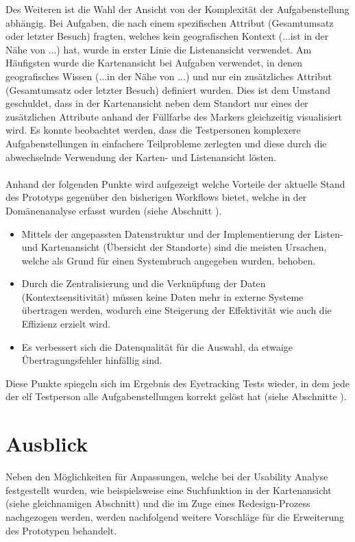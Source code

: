 \documentclass[Bachelorarbeit.tex]{subfiles}
\begin{document}
Des Weiteren ist die Wahl der Ansicht von der Komplexität der Aufgabenstellung abhängig.
Bei Aufgaben, die nach einem spezifischen Attribut (Gesamtumsatz oder letzter Besuch) fragten, welches kein geografischen Kontext (...ist in der Nähe von ...) hat, wurde in erster Linie die Listenansicht verwendet.
Am Häufigsten wurde die Kartenansicht bei Aufgaben verwendet, in denen geografisches Wissen (...in der Nähe von ...) und nur ein zusätzliches Attribut (Gesamtumsatz oder letzter Besuch) definiert wurden.
Dies ist dem Umstand geschuldet, dass in der Kartenansicht neben dem Standort nur eines der zusätzlichen Attribute anhand der Füllfarbe des Markers gleichzeitig visualisiert wird.
Es konnte beobachtet werden, dass die Testpersonen komplexere Aufgabenstellungen in einfachere Teilprobleme zerlegten und diese durch die abwechselnde Verwendung der Karten- und Listenansicht lösten.\\
\\
Anhand der folgenden Punkte wird aufgezeigt welche Vorteile der aktuelle Stand des Prototyps gegenüber den bisherigen Workflows bietet, welche in der Domänenanalyse erfasst wurden (siehe Abschnitt ).
\begin{itemize}
	\item[] Mittels der angepassten Datenstruktur und der Implementierung der Listen- und Kartenansicht (Übersicht der Standorte) sind die meisten Ursachen, welche als Grund für einen Systembruch angegeben wurden, behoben.
	\item[] Durch die Zentralisierung und die Verknüpfung der Daten (Kontextsensitivität) müssen keine Daten mehr in externe Systeme übertragen werden, wodurch eine Steigerung der Effektivität wie auch die Effizienz erzielt wird.
	\item[] Es verbessert sich die Datenqualität für die Auswahl, da etwaige Übertragungsfehler hinfällig sind.
\end{itemize}

Diese Punkte spiegeln sich im Ergebnis des Eyetracking Tests wieder, in dem jede der elf Testperson alle Aufgabenstellungen korrekt gelöst hat (siehe Abschnitte ).

\section{Ausblick}
\label{chap:reflexion:sec:ausblick}

Neben den Möglichkeiten für Anpassungen, welche bei der Usability Analyse festgestellt wurden, wie beispielsweise eine Suchfunktion in der Kartenansicht (siehe gleichnamigen Abschnitt) und die im Zuge eines Redesign-Prozess nachgezogen werden, werden nachfolgend weitere Vorschläge für die Erweiterung des Prototypen behandelt.
\end{document}
